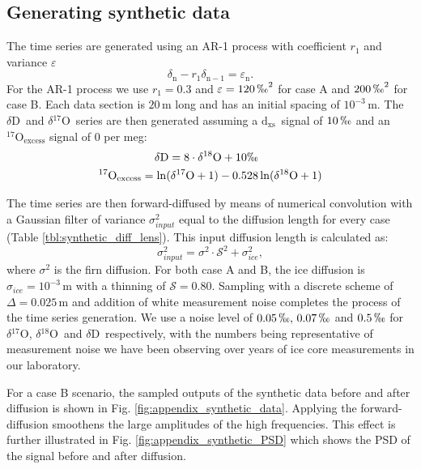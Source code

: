 \documentclass[11pt, draftcls, onecolumn]{IEEEtran} %
\numberwithin{equation}{section}
\numberwithin{table}{section}
\numberwithin{figure}{section}
\newcommand{\delOx}{$\delta{}^{18}\mathrm{O}$}
\newcommand{\delOxb}{$\delta{}^{17}\mathrm{O}$}
\newcommand{\delD}{$\delta\mathrm{D}$}
\newcommand{\Dxs}{$\mathrm{d_{xs}}$}
\begin{document}
\begin{appendices}
\section{Generating synthetic data}	\label{sec:appendix_synthetic}

The time series are generated using an AR-1 process with coefficient $r_1$ and variance $\varepsilon$
\begin{equation}
\delta_{\mathrm{n}} - r_1 \delta_{\mathrm{n-1}} = \varepsilon_{\mathrm{n}}.
\label{eq:appen_ar1}
\end{equation}
For the AR-1 process we use $r_1 = 0.3$ and $\varepsilon = 120\,\permil^2$ for case A and $200\,\permil^2$ for case B.
Each data section is $20\, \mathrm{m}$ long and has an initial spacing of 
$10^{-3}\, \mathrm{m}$. The \delD~and \delOxb~series are then
generated assuming a \Dxs~signal of $10\,\permil$ and an
$^{17}\mathrm{O}_{\mathrm{excess}}$ signal of 0 per meg:
\begin{align} 
\delta\mathrm{D} = 8 \cdot \delta^{18}\mathrm{O} + 10 \permil&\\
^{17}\mathrm{O}_{\mathrm{excess}} = \ln(\delta^{17}\mathrm{O}+1) - 0.528&\ln(\delta^{18}\mathrm{O} +1)
\end{align}

The time series are then forward-diffused by means of numerical convolution 
with a Gaussian filter of variance $\sigma^2_{input}$ equal to the diffusion length 
for every case (Table \ref{tbl:synthetic_diff_lens}). 
This input diffusion length is calculated as:
\begin{equation}
\sigma^2_{input} = \sigma^2 \cdot \mathcal{S}^2 + \sigma^2_{ice},
\end{equation}
where $\sigma^2 $ is the firn diffusion. For both case A and B, the ice diffusion is $\sigma_{ice} = 10^{-3}\,\mathrm{m}$ with a thinning of $\mathcal{S} = 0.80$.
Sampling with a discrete scheme of $\Delta = 0.025\, \mathrm{m}$ and 
addition of white measurement noise completes the process
of the time series generation. We use a noise level of $0.05\,\permil, \,0.07\,\permil$ and $0.5\,\permil$ 
for \delOxb, \delOx~and \delD~respectively, with the numbers 
being representative of measurement noise we have been 
observing over years of ice core measurements in our laboratory.

For a case B scenario, the sampled outputs of the synthetic data before and after diffusion is shown in Fig. \ref{fig:appendix_synthetic_data}.
Applying the forward-diffusion smoothens the large amplitudes of the high frequencies. 
This effect is further illustrated in Fig. \ref{fig:appendix_synthetic_PSD} which shows the PSD of the signal before and after diffusion.


\end{appendices}
\end{document}
